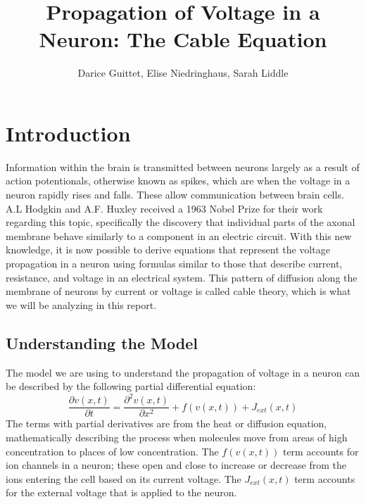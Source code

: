 \documentclass[12pt]{article}
\title{Propagation of Voltage in a Neuron: The Cable Equation}
\author{Darice Guittet, Elise Niedringhaus, Sarah Liddle}
\begin{document}
\maketitle
\section{Introduction}

Information within the brain is transmitted between neurons largely as a result of action potentionals, otherwise known as spikes, which are when the voltage in a neuron rapidly rises and falls. These allow communication between brain cells. A.L Hodgkin and A.F. Huxley received a 1963 Nobel Prize for their work regarding this topic, specifically the discovery that individual parts of the axonal membrane behave similarly to a component in an electric circuit. With this new knowledge, it is now possible to derive equations that represent the voltage propagation in a neuron using formulas similar to those that describe current, resistance, and voltage in an electrical system. This pattern of diffusion along the membrane of neurons by current or voltage is called cable theory, which is what we will be analyzing in this report.

\subsection{Understanding the Model}
The model we are using to understand the propagation of voltage in a neuron can be described by the following partial differential equation:
\begin{equation} \label{1}
\frac{\partial{v(x,t)}}{\partial{t}}=\frac{\partial^2{v(x,t)}}{\partial{x}^2}+f(v(x,t))+J_{ext}(x,t)
\end {equation}
The terms with partial derivatives are from the heat or diffusion equation, mathematically describing the process when molecules move from areas of high concentration to places of low concentration. The $f(v(x,t))$ term accounts for ion channels in a neuron; these open and close to increase or decrease from the ions entering the cell based on its current voltage. The $J_{ext}(x,t)$ term accounts for the external voltage that is applied to the neuron. 
\end{document}
